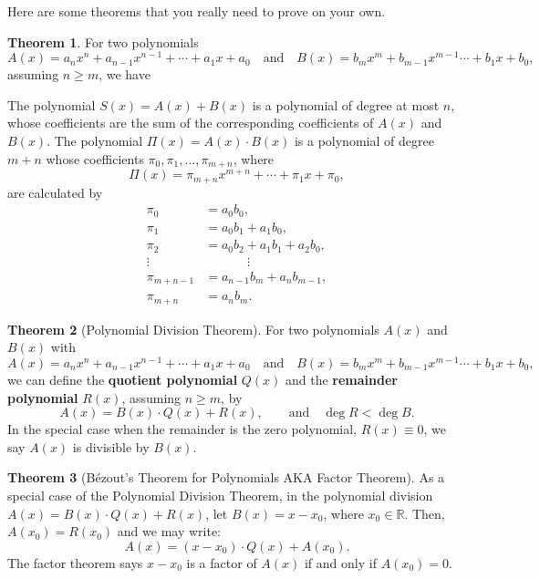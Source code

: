 \documentclass[12pt,a4paper]{memoir}
\theoremstyle{definition}
\newtheorem{theorem}{Theorem}
\begin{document}
Here are some theorems that you really need to prove on your own.


\begin{theorem}
	For two polynomials
	\[A(x)=a_nx^n+a_{n-1}x^{n-1}+\cdots+a_1x+a_0 \quad \text{and} \quad B(x)=b_mx^m+b_{m-1}x^{m-1}\cdots+b_1x+b_0,\]
	assuming $n\geq m$, we have
	\begin{tasks}
		\task The polynomial $S(x)=A(x)+B(x)$ is a polynomial of degree at most $n$, whose coefficients are the sum of the corresponding coefficients of $A(x)$ and $B(x)$.
		\task The polynomial $\Pi(x) = A(x) \cdot B(x)$ is a polynomial of degree $m+n$ whose coefficients $\pi_0,\pi_1,\dots,\pi_{m+n}$, where
		\[\Pi(x) = \pi_{m+n}x^{m+n} + \cdots + \pi_1x+\pi_0,\]
		are calculated by
		\begin{align*}
			\pi_0 &= a_0b_0,\\
			\pi_1 &= a_0b_1 + a_1b_0,\\
			\pi_2 &= a_0b_2+a_1b_1+a_2b_0,\\
			\vdots &\phantom{=} \qquad \vdots\\
			\pi_{m+n-1} &= a_{n-1}b_m + a_nb_{m-1},\\
			\pi_{m+n} &= a_nb_m.
		\end{align*}
	\end{tasks}
\end{theorem}


\begin{theorem}[Polynomial Division Theorem]
	For two polynomials $A(x)$ and $B(x)$ with
	\[A(x)=a_nx^n+a_{n-1}x^{n-1}+\cdots+a_1x+a_0 \quad \text{and} \quad B(x)=b_mx^m+b_{m-1}x^{m-1}\cdots+b_1x+b_0,\]
	we can define the \textbf{quotient polynomial} $Q(x)$ and the \textbf{remainder polynomial} $R(x)$, assuming $n\geq m$, by
	\[A(x) = B(x) \cdot Q(x) + R(x), \qquad \text{and} \quad \deg R < \deg B.\]
	In the special case when the remainder is the zero polynomial, $R(x) \equiv 0$, we say $A(x)$ is divisible by $B(x)$. 
\end{theorem}


\begin{theorem}[Bézout's Theorem for Polynomials AKA Factor Theorem]
	As a special case of the Polynomial Division Theorem, in the polynomial division $A(x) = B(x) \cdot Q(x) + R(x)$, let $B(x)=x-x_0$, where $x_0 \in\mathbb R$. Then, $A(x_0)=R(x_0)$ and we may write:
	\[A(x)=(x-x_0)\cdot Q(x) + A(x_0).\]
	The factor theorem says $x-x_0$ is a factor of $A(x)$ if and only if $A(x_0)=0$.
\end{theorem}
\end{document}
